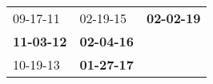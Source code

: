 \begin{supertabular}{p{0.33\columnwidth}p{0.33\columnwidth}p{0.33\columnwidth}}
          09-17-11\textsuperscript{} &           02-19-15\textsuperscript{} &  \textbf{02-02-19\textsuperscript{}} \\
 \textbf{11-03-12\textsuperscript{}} &  \textbf{02-04-16\textsuperscript{}} &                                      \\
          10-19-13\textsuperscript{} &  \textbf{01-27-17\textsuperscript{}} &                                      \\
\end{supertabular}
